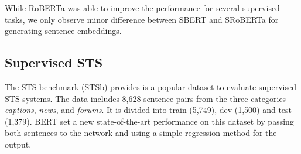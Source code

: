 \documentclass[11pt,a4paper]{article}
\begin{document}
While RoBERTa was able to improve the performance for several supervised tasks, we only observe minor difference between SBERT and SRoBERTa for generating sentence embeddings.


\subsection{Supervised STS} \label{sec_supervised_sts}

The STS benchmark (STSb) \cite{sts2017} provides is a popular dataset to evaluate supervised STS systems. The data includes 8,628 sentence pairs from the three categories \textit{captions}, \textit{news}, and \textit{forums}. It is divided into train (5,749), dev (1,500) and test (1,379). BERT set a new state-of-the-art performance on this dataset by passing both sentences to the network and using a simple regression method for the output.
\end{document}
